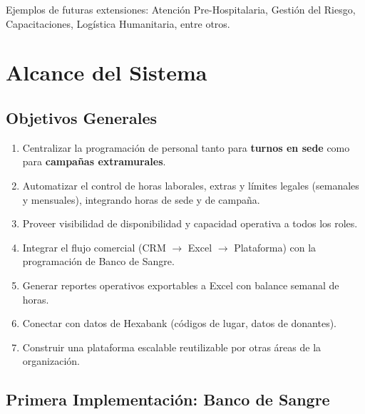 \documentclass[10pt,a4paper]{article}
\begin{document}
Ejemplos de futuras extensiones: Atenci\'{o}n Pre-Hospitalaria, Gesti\'{o}n del Riesgo, Capacitaciones, Log\'{i}stica Humanitaria, entre otros.

\section{Alcance del Sistema}

\subsection{Objetivos Generales}

\begin{enumerate}[leftmargin=2em]
    \item Centralizar la programaci\'{o}n de personal tanto para \textbf{turnos en sede} como para \textbf{campañas extramurales}.
    \item Automatizar el control de horas laborales, extras y l\'{i}mites legales (semanales y mensuales), integrando horas de sede y de campaña.
    \item Proveer visibilidad de disponibilidad y capacidad operativa a todos los roles.
    \item Integrar el flujo comercial (CRM $\rightarrow$ Excel $\rightarrow$ Plataforma) con la programaci\'{o}n de Banco de Sangre.
    \item Generar reportes operativos exportables a Excel con balance semanal de horas.
    \item Conectar con datos de Hexabank (c\'{o}digos de lugar, datos de donantes).
    \item Construir una plataforma escalable reutilizable por otras \'{a}reas de la organizaci\'{o}n.
\end{enumerate}

\subsection{Primera Implementaci\'{o}n: Banco de Sangre}
\end{document}
